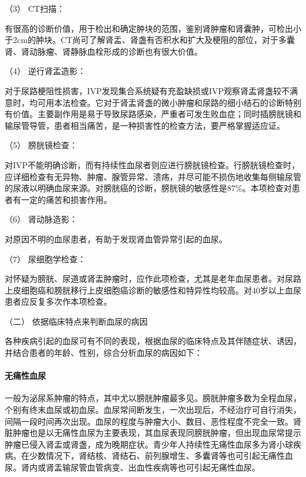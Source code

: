 \hypertarget{text00037.htmlux5cux23CHP1-15-2-4-1-2-3}{}
（3） CT扫描：

有很高的诊断价值，用于检出和确定肿块的范围，鉴别肾肿瘤和肾囊肿，可检出小于2cm的肿块。CT尚可了解肾盂、肾盏有否积水和扩大及梗阻的部位，对于多囊肾、肾动脉瘤、肾静脉血栓形成的诊断也有很大价值。

\hypertarget{text00037.htmlux5cux23CHP1-15-2-4-1-2-4}{}
（4） 逆行肾盂造影：

对于尿路梗阻性损害，IVP发现集合系统疑有充盈缺损或IVP观察肾盂肾盏较不满意时，均可用本法检查。它对于肾盂肾盏的微小肿瘤和尿路的细小结石的诊断特别有价值。主要副作用是易于导致尿路感染，严重者可发生败血症；同时插膀胱镜和输尿管导管，患者相当痛苦，是一种损害性的检查方法，要严格掌握适应证。

\hypertarget{text00037.htmlux5cux23CHP1-15-2-4-1-2-5}{}
（5） 膀胱镜检查：

对IVP不能明确诊断，而有持续性血尿者则应进行膀胱镜检查。行膀胱镜检查时，应详细检查有无异物、肿瘤、腺管异常、溃疡，并尽可能不损伤地收集每侧输尿管的尿液以明确血尿来源。对膀胱癌的诊断，膀胱镜的敏感性是87\%。本项检查对患者有一定的痛苦和损害作用。

\hypertarget{text00037.htmlux5cux23CHP1-15-2-4-1-2-6}{}
（6） 肾动脉造影：

对原因不明的血尿患者，有助于发现肾血管异常引起的血尿。

\hypertarget{text00037.htmlux5cux23CHP1-15-2-4-1-2-7}{}
（7） 尿细胞学检查：

对怀疑为膀胱、尿道或肾盂肿瘤时，应作此项检查，尤其是老年血尿患者。对尿路上皮细胞癌和膀胱移行上皮细胞癌诊断的敏感性和特异性均较高。对40岁以上血尿患者应反复多次作本项检查。

\hypertarget{text00037.htmlux5cux23CHP1-15-2-4-2}{}
（二） 依据临床特点来判断血尿的病因

各种疾病引起的血尿可有不同的表现，根据血尿的临床特点及其伴随症状、诱因，并结合患者的年龄、性别，综合分析血尿的病因如下：

\paragraph{无痛性血尿}

一般为泌尿系肿瘤的特点，其中尤以膀胱肿瘤最多见。膀胱肿瘤多数为全程血尿，个别有终末血尿或初血尿。血尿常间断发生，一次出现后，不经治疗可自行消失，间隔一段时间再次出现。血尿的程度与肿瘤大小、数目、恶性程度不完全一致。肾脏肿瘤也是以无痛性血尿为主要表现，其血尿表现同膀胱肿瘤，但出现血尿常提示肿瘤已侵入肾盂或肾盏，成为晚期症状。青少年人持续性无痛性血尿多为肾小球疾病。在少数情况下，肾结核、肾结石、前列腺增生、多囊肾等也可引起无痛性血尿。肾内或肾盂输尿管血管病变、出血性疾病等也可引起无痛性血尿。

